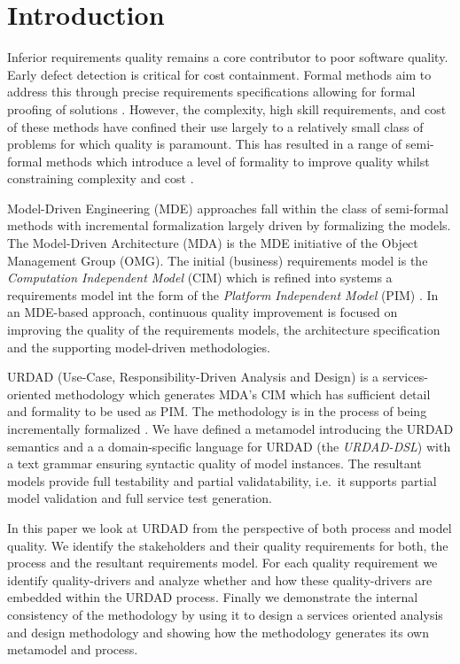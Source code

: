 \section{Introduction}
\label{sec:Introduction}

Inferior requirements quality remains a core contributor to poor software quality\cite{heck_experiences_2008}. Early defect detection is critical for cost containment\cite{biffl_software_2000}. Formal methods aim to address this through precise requirements specifications allowing for formal proofing of solutions \cite{hinchey_software_2008}. However, the complexity, high skill requirements, and cost of these methods have confined their use largely to a relatively small class of problems for which quality is paramount. This has resulted in a range of semi-formal methods which introduce a level of formality to improve quality whilst constraining complexity and cost \cite{razali_usability_2008}.

Model-Driven Engineering (MDE) \cite{frankel_model_2003} approaches fall within the class of semi-formal methods with incremental formalization largely driven by formalizing the models. The Model-Driven Architecture (MDA) is the MDE initiative of the Object Management Group (OMG). The initial (business) requirements model is the \emph{Computation Independent Model} (CIM) which is refined into systems a requirements model int the form of the \emph{Platform Independent Model} (PIM) \cite{_mda_2003}. In an MDE-based approach, continuous quality improvement is focused on improving the quality of the requirements models, the architecture specification and the supporting model-driven methodologies.

URDAD (Use-Case, Responsibility-Driven Analysis and Design) \cite{solms_technology_2007} is a services-oriented methodology which generates MDA's CIM \cite{solms_generating_2009} which has sufficient detail and formality to be used as PIM. The methodology is in the process of being incrementally formalized \cite{solms_urdad_2010}. We have defined a metamodel introducing the URDAD semantics and a a domain-specific language for URDAD (the \emph{URDAD-DSL}) with a text grammar ensuring syntactic quality of model instances. The resultant models provide full testability and partial validatability, i.e.\ it supports partial model validation and full service test generation. 

In this paper we look at URDAD from the perspective of both process and model quality. We identify the stakeholders and their quality requirements for both, the process and the resultant requirements model. For each quality requirement we identify quality-drivers and analyze whether and how these quality-drivers are embedded within the URDAD process. Finally we demonstrate the internal consistency of the methodology by using it to design a services oriented analysis and design methodology and showing how the methodology generates its own metamodel and process.
